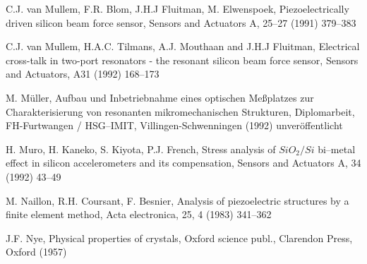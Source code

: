 \begin{thebibliography}{xxx}

 C.J. van Mullem, F.R. Blom, J.H.J Fluitman, M. Elwenspoek,
 Piezoelectrically driven silicon beam force sensor, Sensors and Actuators A,
 25--27 (1991) 379--383

 C.J. van Mullem, H.A.C. Tilmans, A.J. Mouthaan and J.H.J Fluitman,
 Electrical cross-talk in two-port resonators - the resonant silicon beam
 force sensor, Sensors and Actuators, A31 (1992) 168--173

 M. Müller, Aufbau und Inbetriebnahme eines optischen Meßplatzes zur
 Charakterisierung von resonanten mikromechanischen Strukturen,
 Diplomarbeit, FH-Furtwangen / HSG--IMIT, Villingen-Schwenningen (1992)
 unveröffentlicht

 H. Muro, H. Kaneko, S. Kiyota, P.J. French, Stress analysis of
 $SiO_{2}/Si$ bi--metal effect in silicon accelerometers and its
 compensation, Sensors and Actuators A, 34 (1992) 43--49

 M. Naillon, R.H. Coursant, F. Besnier, Analysis of piezoelectric structures
 by a finite element method, Acta electronica, 25, 4 (1983) 341--362





 J.F. Nye, Physical properties of crystals, Oxford science publ.,
 Clarendon Press, Oxford (1957)


\end{thebibliography}
